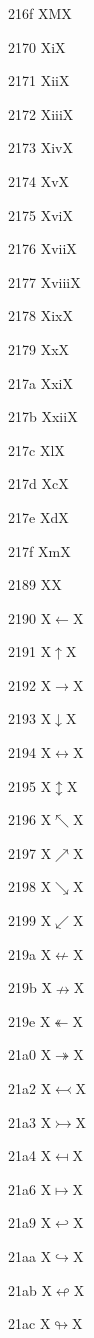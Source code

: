 \documentclass[11pt]{article}
\begin{document}
216f X{M}X

2170 X{i}X

2171 X{ii}X

2172 X{iii}X

2173 X{iv}X

2174 X{v}X

2175 X{vi}X

2176 X{vii}X

2177 X{viii}X

2178 X{ix}X

2179 X{x}X

217a X{xi}X

217b X{xii}X

217c X{l}X

217d X{c}X

217e X{d}X

217f X{m}X

2189 X{}X

2190 X{\ensuremath{\leftarrow}}X

2191 X{\ensuremath{\uparrow}}X

2192 X{\ensuremath{\rightarrow}}X

2193 X{\ensuremath{\downarrow}}X

2194 X{\ensuremath{\leftrightarrow}}X

2195 X{\ensuremath{\updownarrow}}X

2196 X{\ensuremath{\nwarrow}}X

2197 X{\ensuremath{\nearrow}}X

2198 X{\ensuremath{\searrow}}X

2199 X{\ensuremath{\swarrow}}X

219a X{\ensuremath{\nleftarrow}}X

219b X{\ensuremath{\nrightarrow}}X

219e X{\ensuremath{\twoheadleftarrow}}X

21a0 X{\ensuremath{\twoheadrightarrow}}X

21a2 X{\ensuremath{\leftarrowtail}}X

21a3 X{\ensuremath{\rightarrowtail}}X

21a4 X{\ensuremath{\mapsfrom}}X

21a6 X{\ensuremath{\mapsto}}X

21a9 X{\ensuremath{\hookleftarrow}}X

21aa X{\ensuremath{\hookrightarrow}}X

21ab X{\ensuremath{\looparrowleft}}X

21ac X{\ensuremath{\looparrowright}}X
\end{document}
